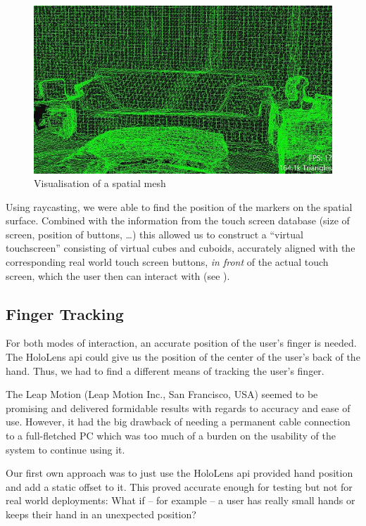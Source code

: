 \begin{figure}[thpb]
	\centering
	\includegraphics[width=\columnwidth]{spatialmapping.jpg}
	\caption{Visualisation of a spatial mesh \cite{spatialmapping}}
	\label{fig:spatialmesh}
\end{figure}

Using raycasting, we were able to find the position of the markers on the spatial surface.
Combined with the information from the touch screen database (size of screen, position of buttons, \dots) this allowed us to construct a \enquote{virtual touchscreen} consisting of virtual cubes and cuboids, accurately aligned with the corresponding real world touch screen buttons, \emph{in front} of the actual touch screen, which the user then can interact with (see ).


\subsection{Finger Tracking}
\label{subsec:finger}
For both modes  of interaction, an accurate position of the user's finger is needed.
The HoloLens \ac{api} could give us the position of the center of the user's  back of the hand.
Thus, we had to find a different means of tracking the user's finger.

The Leap Motion (Leap Motion Inc., San Francisco, USA) seemed to be promising and delivered formidable results with regards to accuracy and ease of use.
However, it had the big drawback of needing a permanent cable connection to a full-fletched PC which was too much of a burden on the usability of the system to continue using it.

Our first own approach was to just use the HoloLens \ac{api} provided hand position and add a static offset to it.
This proved accurate enough for testing but not for real world deployments:
What if -- for example -- a user has really small hands or keeps their hand in an unexpected position?

